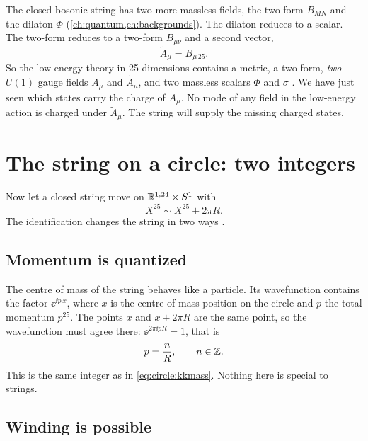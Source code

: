 The closed bosonic string has two more massless fields, the two-form $B_{MN}$ and the dilaton
$\Phi$ (\cref{ch:quantum,ch:backgrounds}). The dilaton reduces to a scalar. The two-form
reduces to a two-form $B_{\mu\nu}$ and a second vector,
\begin{equation}\label{eq:circle:Atilde}
 \tilde A_\mu=B_{\mu\,25}.
\end{equation}
So the low-energy theory in 25 dimensions contains a metric, a two-form, \emph{two} $U(1)$
gauge fields $A_\mu$ and $\tilde A_\mu$, and two massless scalars $\Phi$ and $\sigma$
. We have just seen which states carry the charge of
$A_\mu$. No mode of any field in the low-energy action is charged under $\tilde A_\mu$. The
string will supply the missing charged states.

\section{The string on a circle: two integers}\label{sec:circle:winding}

Now let a closed string move on $\mathbb{R}^{1,24}\times S^1$ with
\begin{equation}\label{eq:circle:ident}
 X^{25}\sim X^{25}+2\pi R .
\end{equation}
The identification changes the string in two ways .

\subsection{Momentum is quantized}

The centre of mass of the string behaves like a particle. Its wavefunction contains the
factor $\ee^{\ii p\,x}$, where $x$ is the centre-of-mass position on the circle and $p$ the
total momentum $p^{25}$. The points $x$ and $x+2\pi R$ are the same point, so the wavefunction
must agree there: $\ee^{2\pi\ii pR}=1$, that is
\begin{equation}\label{eq:circle:momentum}
 p=\frac nR,\qquad n\in\mathbb{Z} .
\end{equation}
This is the same integer as in \eqref{eq:circle:kkmass}. Nothing
here is special to strings.

\subsection{Winding is possible}

